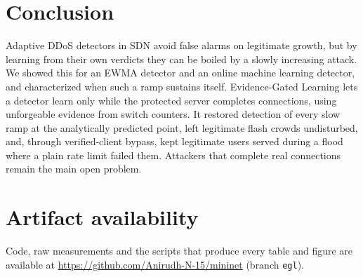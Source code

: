 \documentclass[conference]{IEEEtran}
\begin{document}
\section{Conclusion}
Adaptive DDoS detectors in SDN avoid false alarms on legitimate growth, but by learning from their own verdicts they can be boiled by a slowly increasing attack. We showed this for an EWMA detector and an online machine learning detector, and characterized when such a ramp sustains itself. Evidence-Gated Learning lets a detector learn only while the protected server completes connections, using unforgeable evidence from switch counters. It restored detection of every slow ramp at the analytically predicted point, left legitimate flash crowds undisturbed, and, through verified-client bypass, kept legitimate users served during a flood where a plain rate limit failed them. Attackers that complete real connections remain the main open problem.

\section*{Artifact availability}
Code, raw measurements and the scripts that produce every table and figure are available at \url{https://github.com/Anirudh-N-15/mininet} (branch \texttt{egl}).



\end{document}
